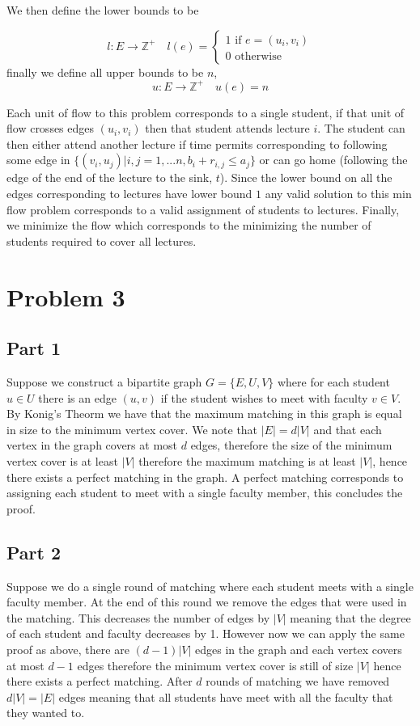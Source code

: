 \documentclass[a4paper]{article}
\begin{document}
We then define the lower bounds to be

$$
l : E \rightarrow \mathds{Z}^+ \quad
l(e) = \begin{cases}
	1 \text{  if  } e = (u_i, v_i)\\
	0 \text{  otherwise }
\end{cases}
$$
finally we define all upper bounds to be $n$,
$$
u : E \rightarrow \mathds{Z}^+ \quad
u(e) = n
$$ 

Each unit of flow to this problem corresponds to a single student, if that
unit of flow crosses edges $(u_i, v_i)$ then that student attends lecture $i$. 
The student can then either attend another lecture if time permits corresponding 
to following some edge in $\{(v_i, u_j) | i,j=1,...n, b_i + r_{i,j} \leq a_j\}$ or can 
go home (following the edge of the end of the lecture to the sink, $t$). Since the lower bound on 
all the edges corresponding to lectures have lower bound $1$ any valid solution to this min flow 
problem corresponds to a valid assignment of students to lectures. Finally, we minimize the flow 
which corresponds to the minimizing the number of students required to cover all lectures.

\section{Problem 3}

\subsection{Part 1}

Suppose we construct a bipartite graph $G = \{E, U, V\}$ where for each student $u \in U$ there 
is an edge $(u,v)$ if the student wishes to meet with faculty $v \in V$. By Konig's Theorm
we have that the maximum matching in this graph is equal in size to the minimum vertex cover. We
note that $|E| = d|V|$ and that each vertex in the graph covers at most $d$ edges, therefore the 
size of the minimum vertex cover is at least $|V|$ therefore the maximum matching is at least $|V|$,
hence there exists a perfect matching in the graph. A perfect matching corresponds to assigning
each student to meet with a single faculty member, this concludes the proof.

\subsection{Part 2}

Suppose we do a single round of matching where each student meets with a single faculty member. At the
end of this round we remove the edges that were used in the matching. This decreases the number of
edges by $|V|$ meaning that the degree of each student and faculty decreases by 1. However now we can apply the same proof as above, 
there are $(d-1)|V|$ edges in the graph and each vertex covers at most $d-1$ edges therefore the minimum
vertex cover is still of size $|V|$ hence there exists a perfect matching. After $d$ rounds 
of matching we have removed $d|V| = |E|$ edges meaning that all students have meet with all the faculty that 
they wanted to.
\end{document}
